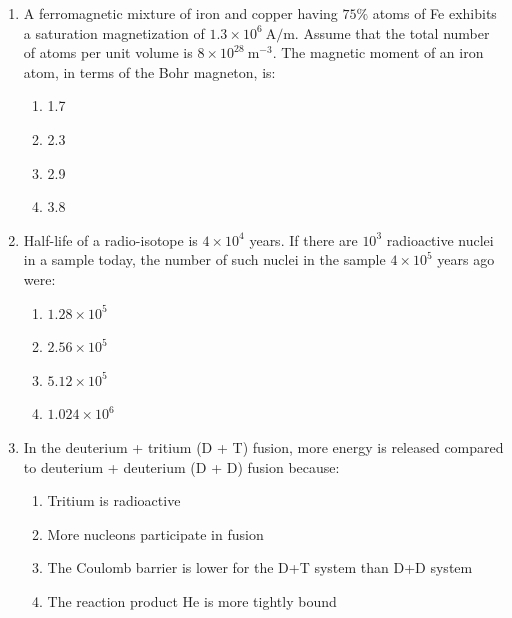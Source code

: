 \documentclass[journal,12pt,onecolumn]{IEEEtran}
\begin{document}
\begin{enumerate}[itemsep = 1em]
\item A ferromagnetic mixture of iron and copper having $75\%$ atoms of Fe exhibits a saturation magnetization of $1.3 \times 10^6 \ \mathrm{A/m}$. Assume that the total number of atoms per unit volume is $8 \times 10^{28} \ \mathrm{m}^{-3}$. The magnetic moment of an iron atom, in terms of the Bohr magneton, is:  

\hfill{}

\begin{multicols}{2}
\begin{enumerate}
    \item 1.7
    \item 2.3
    \item 2.9
    \item 3.8
\end{enumerate}
\end{multicols}

\item Half-life of a radio-isotope is $4 \times 10^4$ years. If there are $10^3$ radioactive nuclei in a sample today, the number of such nuclei in the sample $4 \times 10^5$ years ago were:  

\hfill{}

\begin{multicols}{2}
\begin{enumerate}
    \item $1.28 \times 10^5$
    \item $2.56 \times 10^5$
    \item $5.12 \times 10^5$
    \item $1.024 \times 10^6$
\end{enumerate}
\end{multicols}

\item In the deuterium + tritium (D + T) fusion, more energy is released compared to deuterium + deuterium (D + D) fusion because:  

\hfill{}

\begin{multicols}{2}
\begin{enumerate}
    \item Tritium is radioactive
    \item More nucleons participate in fusion
    \item The Coulomb barrier is lower for the D+T system than D+D system
    \item The reaction product He is more tightly bound
\end{enumerate}
\end{multicols}


\end{enumerate}
\end{document}
